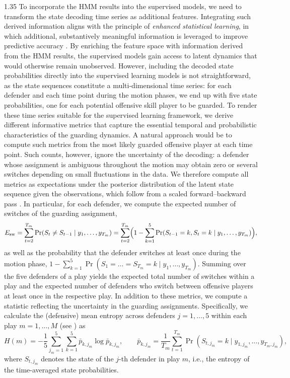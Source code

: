 \documentclass[12pt,a4paper]{article}
\begin{document}
\begin{spacing}{1.35}
To incorporate the HMM results into the supervised models, we need to transform the state decoding time series as additional features. Integrating such derived information aligns with the principle of \textit{enhanced statistical learning}, in which additional, substantively meaningful information is leveraged to improve predictive accuracy \citep{felice2025boosting}. By enriching the feature space with information derived from the HMM results, the supervised models gain access to latent dynamics that would otherwise remain unobserved. However, including the decoded state probabilities directly into the supervised learning models is not straightforward, as the state sequences constitute a multi-dimensional time series: for each defender and each time point during the motion phases, we end up with five state probabilities, one for each potential offensive skill player to be guarded. %
To render these time series suitable for the supervised
learning framework, we derive different informative metrics that capture the essential temporal
and probabilistic characteristics of the guarding dynamics.
A natural approach would be to compute such metrics from the most likely guarded offensive player at each time point. Such counts, however, ignore the uncertainty of the decoding: a defender whose assignment is ambiguous throughout the motion may obtain zero or several switches depending on small fluctuations in the data. We therefore compute all metrics as expectations under the posterior distribution of the latent state sequence given the observations, which follow from a scaled forward--backward pass \citep{zucchini}.
In particular, for each defender, we compute the expected number of switches of the guarding assignment,
\begin{equation}\label{eq:decod}
E_{\text{sw}} = \sum_{t=2}^{T_m} \Pr(S_t \neq S_{t-1} \mid y_1, \dots, y_{T_m}) = \sum_{t=2}^{T_m} \Bigl(1 - \sum_{k=1}^{5} \Pr(S_{t-1} = k, S_t = k \mid y_1, \dots, y_{T_m})\Bigr),
\end{equation}
as well as the probability that the defender switches at least once during the motion phase, $1 - \sum_{k=1}^{5} \Pr(S_1 = \dots = S_{T_m} = k \mid y_1, \dots, y_{T_m})$. Summing over the five defenders of a play yields the expected total number of switches within a play and the expected number of defenders who switch between offensive players at least once in the respective play.
In addition to these metrics, we compute a statistic reflecting the uncertainty in the guarding assignments. Specifically, we calculate the (defensive) mean entropy across defenders $j = 1, \ldots, 5$ within each play $m = 1, \ldots, M$ (see \citealp{franks2015}) as
\[
H(m) = -\frac{1}{5} \sum_{j_m=1}^{5} \sum_{k=1}^{5} \bar{p}_{k,j_m} \log \bar{p}_{k,j_m}, \qquad \bar{p}_{k,j_m} = \frac{1}{T_m} \sum_{t=1}^{T_m} \Pr(S_{t,j_m} = k \mid y_{1,j_m}, \dots, y_{T_m,j_m}),
\]
where $S_{t,j_m}$ denotes the state of the $j$-th defender in play $m$, i.e., the entropy of the time-averaged state probabilities.


\end{spacing}
\end{document}
